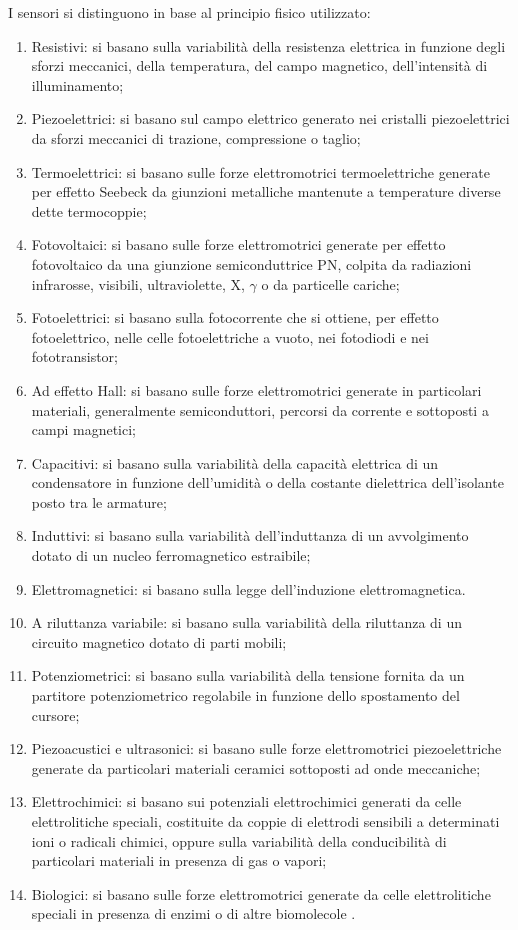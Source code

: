 \documentclass[a4paper]{report} %
\begin{document}
I sensori si distinguono in base al principio fisico utilizzato:
\begin{enumerate}
\item Resistivi: si basano sulla variabilità della resistenza elettrica in funzione degli sforzi meccanici, della temperatura, del campo magnetico, dell'intensità di illuminamento;
\item Piezoelettrici: si basano sul campo elettrico generato nei cristalli piezoelettrici da sforzi meccanici di trazione, compressione o taglio;
\item Termoelettrici: si basano sulle forze elettromotrici termoelettriche generate per effetto Seebeck da giunzioni metalliche mantenute a temperature diverse dette termocoppie;
\item Fotovoltaici: si basano sulle forze elettromotrici generate per effetto fotovoltaico da una giunzione semiconduttrice PN, colpita da radiazioni infrarosse, visibili, ultraviolette, X,        $\gamma$ o da particelle cariche;
\item Fotoelettrici: si basano sulla fotocorrente che si ottiene, per effetto fotoelettrico, nelle celle fotoelettriche a vuoto, nei fotodiodi e nei fototransistor;
\item Ad effetto Hall: si basano sulle forze elettromotrici generate in particolari materiali, generalmente semiconduttori, percorsi da corrente e sottoposti a campi magnetici;
\item Capacitivi: si basano sulla variabilità della capacità elettrica di un condensatore in funzione dell'umidità o della costante dielettrica dell'isolante posto tra le armature;
\item Induttivi: si basano sulla variabilità dell'induttanza di un avvolgimento dotato di un nucleo ferromagnetico estraibile;
\item Elettromagnetici: si basano sulla legge dell'induzione elettromagnetica.
\item A riluttanza variabile: si basano sulla variabilità della riluttanza di un circuito magnetico dotato di parti mobili;
\item Potenziometrici: si basano sulla variabilità della tensione fornita da un partitore potenziometrico regolabile in funzione dello spostamento del cursore;
\item Piezoacustici e ultrasonici: si basano sulle forze elettromotrici piezoelettriche generate da particolari materiali ceramici sottoposti ad onde meccaniche;
\item Elettrochimici: si basano sui potenziali elettrochimici generati da celle elettrolitiche speciali, costituite da coppie di elettrodi sensibili a determinati ioni o radicali chimici, oppure sulla variabilità della conducibilità di particolari materiali in presenza di gas o vapori;
\item Biologici: si basano sulle forze elettromotrici generate da celle elettrolitiche speciali in presenza di enzimi o di altre biomolecole \cite{art:rif.1}.
\end{enumerate}
\end{document}
